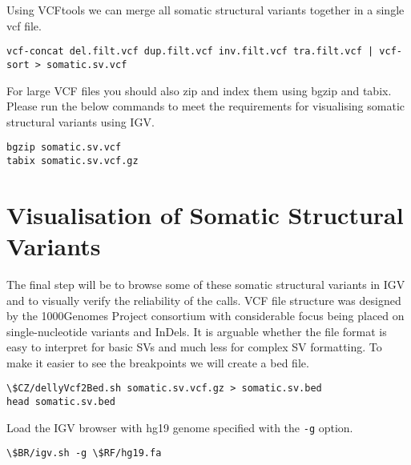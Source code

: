 \begin{steps}
Using VCFtools we can merge all somatic structural variants together in a single vcf file.
\begin{lstlisting}
vcf-concat del.filt.vcf dup.filt.vcf inv.filt.vcf tra.filt.vcf | vcf-sort > somatic.sv.vcf
\end{lstlisting}
\end{steps}

\begin{information}
For large VCF files you should also zip and index them using bgzip and tabix. Please run the below commands to meet the requirements for visualising somatic structural variants using IGV.  
\end{information}

\begin{steps}
\begin{lstlisting}
bgzip somatic.sv.vcf
tabix somatic.sv.vcf.gz
\end{lstlisting}
\end{steps}



\section{Visualisation of Somatic Structural Variants}

\begin{information}
The final step will be to browse some of these somatic structural variants in IGV and to visually verify the reliability of the calls. VCF file structure was designed by the 1000Genomes Project consortium with considerable focus being placed on single-nucleotide variants and InDels. It is arguable whether the file format is easy to interpret for basic SVs and much less for complex SV formatting. To make it easier to see the breakpoints we will create a bed file. 

\end{information}
\begin{steps}
\begin{lstlisting}
\$CZ/dellyVcf2Bed.sh somatic.sv.vcf.gz > somatic.sv.bed
head somatic.sv.bed
\end{lstlisting}
\end{steps}

\begin{steps}
Load the IGV browser with hg19 genome specified with the \texttt{-g} option.
\begin{lstlisting}
\$BR/igv.sh -g \$RF/hg19.fa
\end{lstlisting}
\end{steps}

